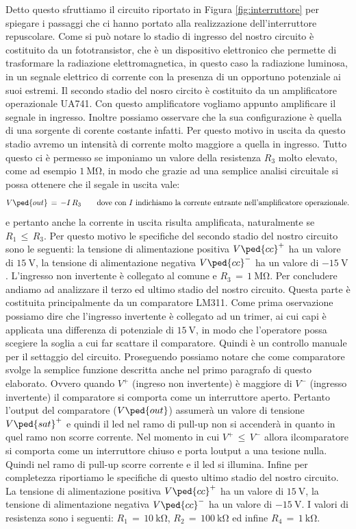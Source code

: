 Detto questo sfruttiamo il circuito riportato in Figura \ref{fig:interruttore} per spiegare i passaggi che ci hanno portato alla realizzazione dell'interruttore repuscolare. Come si può notare lo stadio di ingresso del nostro circuito è costituito da un fototransistor, che è un dispositivo elettronico che permette di trasformare la radiazione elettromagnetica, in questo caso la radiazione luminosa, in un segnale elettrico di corrente con la presenza di un opportuno potenziale ai suoi estremi.
Il secondo stadio del nosro circito è costituito da un amplificatore operazionale UA741. Con questo amplificatore vogliamo appunto amplificare il segnale in ingresso. Inoltre possiamo osservare che la sua configurazione è quella di una sorgente di corente costante infatti. Per questo motivo in uscita da questo stadio avremo un intensità di corrente molto maggiore a quella in ingresso. Tutto questo ci è permesso se imponiamo un valore della resistenza $R_3$ molto elevato, come ad esempio $\SI{1}{\mega\ohm}$, in modo che grazie ad una semplice analisi circuitale si possa ottenere che il segale in uscita vale:
\begin{equation}
        V\ped{out}\,=\,-I\,R_3 \qquad \text{dove con $I$ indichiamo la corrente entrante nell'amplificatore operazionale.}
\end{equation}
e pertanto anche la corrente in uscita risulta amplificata, naturalmente se $R_1\,\leq\,R_3$.
Per questo motivo le specifiche del secondo stadio del nostro circuito sono le seguenti: la tensione di alimentazione positiva $V\ped{cc}^+$ ha un valore di $\SI{+15}{\volt}$, la tensione di alimentazione negativa $V\ped{cc}^-$ ha un valore di $\SI{-15}{\volt}$. L'ingresso non invertente è collegato al comune e $R_3\,=\,\SI{1}{\mega\ohm}$.
Per concludere andiamo ad analizzare il terzo ed ultimo stadio del nostro circuito. Questa parte è costituita principalmente da un comparatore LM311. Come prima oservazione possiamo dire che l'ingresso invertente è collegato ad un trimer, ai cui capi è applicata una differenza di potenziale di $\SI{+15}{\volt}$, in modo che l'operatore possa scegiere la soglia a cui far scattare il comparatore. Quindi è un controllo manuale per il settaggio del circuito. Proseguendo possiamo notare che come comparatore svolge la semplice funzione descritta anche nel primo paragrafo di questo elaborato. Ovvero quando $V^+$ (ingreso non invertente) è maggiore di $V^-$ (ingresso invertente) il comparatore si comporta come un interruttore aperto. Pertanto l'output del comparatore ($V\ped{out}$) assumerà un valore di tensione $V\ped{sat}^+$ e quindi il led nel ramo di pull-up non si accenderà in quanto in quel ramo non scorre corrente. Nel momento in cui $V^+\,\leq\,V^-$ allora ilcomparatore si comporta come un interruttore chiuso e porta loutput a una tesione nulla. Quindi nel ramo di pull-up scorre corrente e il led si illumina.
Infine per completezza riportiamo le specifiche di questo ultimo stadio del nostro circuito. La tensione di alimentazione positiva $V\ped{cc}^+$ ha un valore di $\SI{+15}{\volt}$, la tensione di alimentazione negativa $V\ped{cc}^-$ ha un valore di $\SI{-15}{\volt}$. I valori di resistenza sono i seguenti: $R_1\,=\,\SI{10}{\kilo\ohm}$, $R_2\,=\,\SI{100}{\kilo\ohm}$ ed infine $R_4\,=\,\SI{1}{\kilo\ohm}$. 

